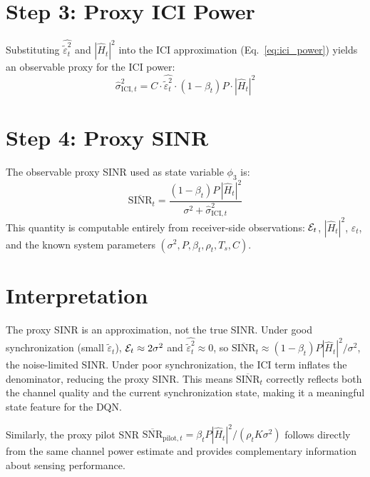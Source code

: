 \section{Step 3: Proxy ICI Power}

Substituting $\widehat{\tilde{\varepsilon}_t^2}$ and $|\hat{H}_t|^2$ into the ICI approximation (Eq.~\ref{eq:ici_power}) yields an observable proxy for the ICI power:
\[
    \hat{\sigma}^2_{\text{ICI},t} = C \cdot \widehat{\tilde{\varepsilon}_t^2} \cdot (1-\beta_t)P \cdot |\hat{H}_t|^2
\]

\section{Step 4: Proxy SINR}

The observable proxy SINR used as state variable $\phi_3$ is:
\begin{equation}
    \overline{\text{SINR}}_t = \frac{(1-\beta_t)P\,|\hat{H}_t|^2}{\sigma^2 + \hat{\sigma}^2_{\text{ICI},t}}
    \label{eq:sinr_proxy}
\end{equation}
This quantity is computable entirely from receiver-side observations: $\mathcal{E}_t$, $|\hat{H}_t|^2$, $\hat{\varepsilon}_t$, and the known system parameters $(\sigma^2, P, \beta_t, \rho_t, T_s, C)$.

\section{Interpretation}

The proxy SINR is an approximation, not the true SINR. Under good synchronization (small $\tilde{\varepsilon}_t$), $\mathcal{E}_t \approx 2\sigma^2$ and $\widehat{\tilde{\varepsilon}_t^2} \approx 0$, so $\overline{\text{SINR}}_t \approx (1-\beta_t)P|\hat{H}_t|^2/\sigma^2$, the noise-limited SINR. Under poor synchronization, the ICI term inflates the denominator, reducing the proxy SINR. This means $\overline{\text{SINR}}_t$ correctly reflects both the channel quality and the current synchronization state, making it a meaningful state feature for the DQN.

Similarly, the proxy pilot SNR $\overline{\text{SNR}}_{\text{pilot},t} = \beta_t P |\hat{H}_t|^2 / (\rho_t K \sigma^2)$ follows directly from the same channel power estimate and provides complementary information about sensing performance.
